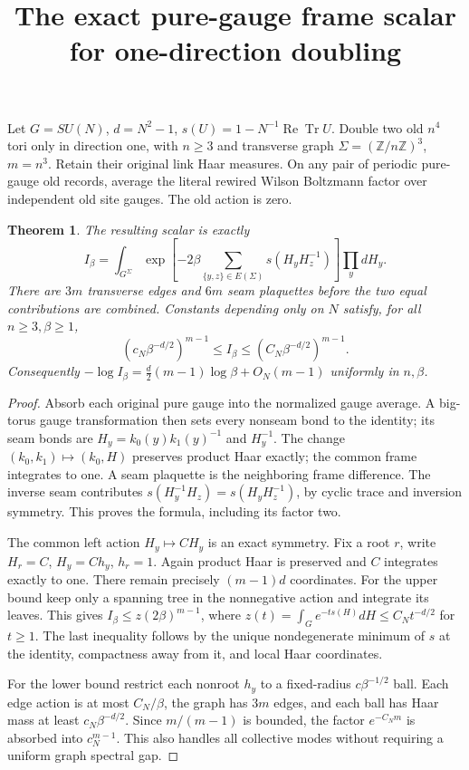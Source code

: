 \documentclass{article}
\title{The exact pure-gauge frame scalar for one-direction doubling}\author{}\date{}
\newtheorem{theorem}{Theorem}
\begin{document}
\maketitle
Let $G=SU(N)$, $d=N^2-1$, $s(U)=1-N^{-1}\operatorname{Re}\operatorname{Tr}U$. Double two old $n^4$ tori only in direction one, with $n\ge3$ and transverse graph $\Sigma=(\mathbb Z/n\mathbb Z)^3$, $m=n^3$. Retain their original link Haar measures. On any pair of periodic pure-gauge old records, average the literal rewired Wilson Boltzmann factor over independent old site gauges. The old action is zero.

\begin{theorem}
The resulting scalar is exactly
\[
 I_\beta=\int_{G^\Sigma}\exp\left[-2\beta\sum_{\{y,z\}\in E(\Sigma)}s(H_yH_z^{-1})\right]\prod_y dH_y.
\]
There are $3m$ transverse edges and $6m$ seam plaquettes before the two equal contributions are combined. Constants depending only on $N$ satisfy, for all $n\ge3,\beta\ge1$,
\[
 (c_N\beta^{-d/2})^{m-1}\le I_\beta\le(C_N\beta^{-d/2})^{m-1}.
\]
Consequently $-\log I_\beta=\frac d2(m-1)\log\beta+O_N(m-1)$ uniformly in $n,\beta$.
\end{theorem}
\begin{proof}
Absorb each original pure gauge into the normalized gauge average. A big-torus gauge transformation then sets every nonseam bond to the identity; its seam bonds are $H_y=k_0(y)k_1(y)^{-1}$ and $H_y^{-1}$. The change $(k_0,k_1)\mapsto(k_0,H)$ preserves product Haar exactly; the common frame integrates to one. A seam plaquette is the neighboring frame difference. The inverse seam contributes $s(H_y^{-1}H_z)=s(H_yH_z^{-1})$, by cyclic trace and inversion symmetry. This proves the formula, including its factor two.

The common left action $H_y\mapsto C H_y$ is an exact symmetry. Fix a root $r$, write $H_r=C$, $H_y=C h_y$, $h_r=1$. Again product Haar is preserved and $C$ integrates exactly to one. There remain precisely $(m-1)d$ coordinates. For the upper bound keep only a spanning tree in the nonnegative action and integrate its leaves. This gives $I_\beta\le z(2\beta)^{m-1}$, where $z(t)=\int_G e^{-t s(H)}dH\le C_N t^{-d/2}$ for $t\ge1$. The last inequality follows by the unique nondegenerate minimum of $s$ at the identity, compactness away from it, and local Haar coordinates.

For the lower bound restrict each nonroot $h_y$ to a fixed-radius $c\beta^{-1/2}$ ball. Each edge action is at most $C_N/\beta$, the graph has $3m$ edges, and each ball has Haar mass at least $c_N\beta^{-d/2}$. Since $m/(m-1)$ is bounded, the factor $e^{-C_Nm}$ is absorbed into $c_N^{m-1}$. This also handles all collective modes without requiring a uniform graph spectral gap.
\end{proof}
\end{document}
